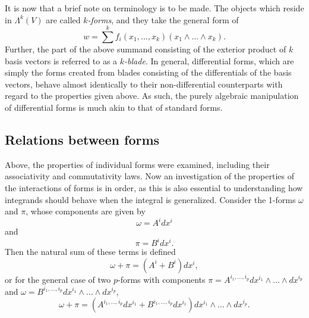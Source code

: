 \documentclass[.../main.tex]{subfiles}
\begin{document}
It is now that a brief note on terminology is to be made. The objects which reside in $\Lambda^k(V)$ are called $k$\textit{-forms}, and they take the general form of 
\begin{equation}
	w = \sum\limits^{k} f_i (x_1, \dots, x_k)(x_1 \wedge \dots \wedge x_k).
	\label{eqn: 3.1}
\end{equation}
Further, the part of the above summand consisting of the exterior product of $k$ basis vectors is referred to as a $k$\textit{-blade}. In general, differential forms, which are simply the forms created from blades consisting of the differentials of the basis vectors, behave almost identically to their non-differential counterparts with regard to the properties given above. As such, the purely algebraic manipulation of differential forms is much akin to that of standard forms.


\subsection{Relations between forms} \label{subsection: 3.2}
Above, the properties of individual forms were examined, including their associativity and commutativity laws. Now an investigation of the properties of the interactions of forms is in order, as this is also essential to understanding how integrands should behave when the integral is generalized. Consider the 1-forms $\omega$ and $\pi$, whose components are given by
\[
	\omega = A^i dx^i
\]
and 
\[
	\pi = B^i dx^i.
\]
Then the natural sum of these terms is defined
\begin{equation}
	\omega + \pi = (A^i + B^i) dx^i,
	\label{eqn: 3.2}	
\end{equation}
or for the general case of two $p$-forms with components $\pi = A^{i_1, \dots,i_p} dx^{i_1} \wedge \dots \wedge dx^{i_p}$ and $\omega = B^{i_1, \dots, i_p} dx^{i_1} \wedge \dots \wedge dx^{i_p}$, 
\begin{equation}
	\omega + \pi = (A^{i_1, \dots, i_p} dx^{i_1} +  B^{i_1, \dots,i_p} dx^{i_1}) dx^{i_1} \wedge \dots \wedge dx^{i_p}.
	\label{eqn: 3.3}
\end{equation}
\end{document}
